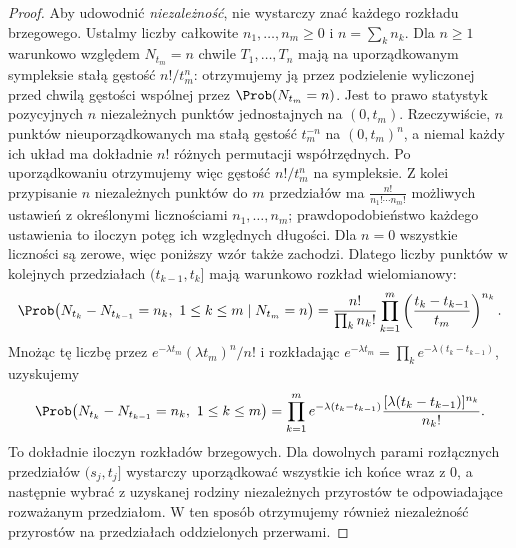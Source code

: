 \begin{proof}
Aby udowodnić \emph{niezależność}, nie wystarczy znać każdego
rozkładu brzegowego. Ustalmy liczby całkowite $n_1,\ldots,n_m\ge0$
i $n=\sum_k n_k$. Dla $n\ge1$ warunkowo względem
$N_{t_m}=n$ chwile
$T_1,\ldots,T_n$ mają na uporządkowanym sympleksie stałą gęstość
$n!/t_m^n$: otrzymujemy ją przez podzielenie wyliczonej przed chwilą
gęstości wspólnej przez $\Prob(N_{t_m}=n)$.
Jest to prawo statystyk pozycyjnych $n$ niezależnych punktów
jednostajnych na $(0,t_m)$. Rzeczywiście, $n$ punktów
nieuporządkowanych ma stałą gęstość $t_m^{-n}$ na
$(0,t_m)^n$, a niemal każdy ich układ ma dokładnie $n!$
różnych permutacji współrzędnych. Po uporządkowaniu otrzymujemy więc
gęstość $n!/t_m^n$ na sympleksie. Z kolei przypisanie
$n$ niezależnych punktów do $m$ przedziałów ma
$\frac{n!}{n_1!\cdots n_m!}$ możliwych ustawień
z określonymi licznościami $n_1,\ldots,n_m$; prawdopodobieństwo
każdego ustawienia to iloczyn potęg ich względnych długości.
Dla $n=0$ wszystkie liczności są zerowe, więc
poniższy wzór także zachodzi. Dlatego liczby punktów w kolejnych
przedziałach $(t_{k-1},t_k]$ mają warunkowo rozkład wielomianowy:
\[
\Prob\bigl(N_{t_k}-N_{t_{k-1}}=n_k,\ 1\le k\le m
 \mid N_{t_m}=n\bigr)
=\frac{n!}{\prod_k n_k!}\prod_{k=1}^m
 \left(\frac{t_k-t_{k-1}}{t_m}\right)^{n_k}.
\]
Mnożąc tę liczbę przez $e^{-\lambda t_m}(\lambda t_m)^n/n!$
i rozkładając $e^{-\lambda t_m}=\prod_k e^{-\lambda(t_k-t_{k-1})}$,
uzyskujemy
\[
\Prob\bigl(N_{t_k}-N_{t_{k-1}}=n_k,\ 1\le k\le m\bigr)
=\prod_{k=1}^m e^{-\lambda(t_k-t_{k-1})}
  \frac{[\lambda(t_k-t_{k-1})]^{n_k}}{n_k!}.
\]
To dokładnie iloczyn rozkładów brzegowych.
Dla dowolnych parami rozłącznych przedziałów $(s_j,t_j]$
wystarczy uporządkować wszystkie ich końce wraz z $0$,
a następnie wybrać z uzyskanej rodziny niezależnych
przyrostów te odpowiadające rozważanym przedziałom.
W ten sposób otrzymujemy również niezależność
przyrostów na przedziałach oddzielonych przerwami.
\end{proof}


